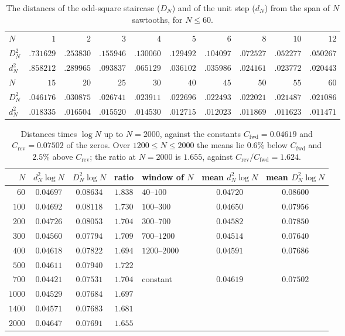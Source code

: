 \documentclass[11pt]{article}
\theoremstyle{definition}\newtheorem{definition}[theorem]{Definition}
\theoremstyle{remark}\newtheorem{remark}[theorem]{Remark}
\theoremstyle{definition}\newtheorem{axiom}{Axiom}
\begin{document}
\begin{table}[!htbp]\centering\small
\setlength{\tabcolsep}{3.4pt}
\begin{tabular}{@{}lrrrrrrrrr@{}}\toprule
$N$ & $1$ & $2$ & $3$ & $4$ & $5$ & $6$ & $8$ & $10$ & $12$\\
$D_N^2$ & $.731629$ & $.253830$ & $.155946$ & $.130060$ & $.129492$ & $.104097$ & $.072527$ & $.052277$ & $.050267$\\
$d_N^2$ & $.858212$ & $.289965$ & $.093837$ & $.065129$ & $.036102$ & $.035986$ & $.024161$ & $.023772$ & $.020443$\\\midrule
$N$ & $15$ & $20$ & $25$ & $30$ & $40$ & $45$ & $50$ & $55$ & $60$\\
$D_N^2$ & $.046176$ & $.030875$ & $.026741$ & $.023911$ & $.022696$ & $.022493$ & $.022021$ & $.021487$ & $.021086$\\
$d_N^2$ & $.018335$ & $.016504$ & $.015520$ & $.014530$ & $.012715$ & $.012023$ & $.011869$ & $.011623$ & $.011471$\\\bottomrule
\end{tabular}
\caption{The distances of the odd-square staircase ($D_N$) and of the unit step ($d_N$) from the span of $N$ sawtooths, for $N\le60$.}\label{tab:DNsmall}
\end{table}

\begin{table}[!htbp]\centering\small
\begin{tabular}{@{}rccc@{\qquad}lcc@{}}\toprule
$N$ & $d_N^2\log N$ & $D_N^2\log N$ & ratio & window of $N$ & mean $d_N^2\log N$ & mean $D_N^2\log N$\\\midrule
$60$ & $0.04697$ & $0.08634$ & $1.838$ & $40$--$100$ & $0.04720$ & $0.08600$\\
$100$ & $0.04692$ & $0.08118$ & $1.730$ & $100$--$300$ & $0.04650$ & $0.07956$\\
$200$ & $0.04726$ & $0.08053$ & $1.704$ & $300$--$700$ & $0.04582$ & $0.07850$\\
$300$ & $0.04560$ & $0.07794$ & $1.709$ & $700$--$1200$ & $0.04514$ & $0.07640$\\
$400$ & $0.04618$ & $0.07822$ & $1.694$ & $1200$--$2000$ & $0.04591$ & $0.07686$\\
$500$ & $0.04611$ & $0.07940$ & $1.722$ & & &\\
$700$ & $0.04421$ & $0.07531$ & $1.704$ & constant & $0.04619$ & $0.07502$\\
$1000$ & $0.04529$ & $0.07684$ & $1.697$ & & &\\
$1400$ & $0.04571$ & $0.07683$ & $1.681$ & & &\\
$2000$ & $0.04647$ & $0.07691$ & $1.655$ & & &\\\bottomrule
\end{tabular}
\caption{Distances times $\log N$ up to $N=2000$, against the constants $C_{\mathrm{fwd}}=0.04619$ and $C_{\mathrm{rev}}=0.07502$ of the zeros. Over $1200\le N\le2000$ the means lie $0.6\%$ below $C_{\mathrm{fwd}}$ and $2.5\%$ above $C_{\mathrm{rev}}$; the ratio at $N=2000$ is $1.655$, against $C_{\mathrm{rev}}/C_{\mathrm{fwd}}=1.624$.}\label{tab:DN}
\end{table}
\end{document}
